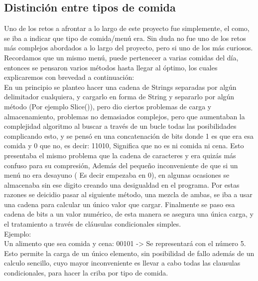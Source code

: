 \subsection{Distinción entre tipos de comida}
Uno de los retos a afrontar a lo largo de este proyecto fue simplemente, el como, se iba a indicar que tipo de comida/menú era. Sin duda no fue uno de los retos más complejos abordados a lo largo del proyecto, pero si uno de los más curiosos.
Recordamos que un mismo menú, puede pertenecer a varias comidas del día, entonces se pensaron varios métodos hasta llegar al óptimo, los cuales explicaremos con brevedad a continuación:\\

En un principio se planteo hacer una cadena de Strings separadas por algún delimitador cualquiera, y cargarlo en forma de String y separarlo por algún método (Por ejemplo Slice()), pero dio ciertos problemas de carga y almacenamiento, problemas no demasiados complejos, pero que aumentaban la complejidad algoritmo al buscar a través de un bucle todas las posibilidades complicando esto, y se pensó en una concatenación de bits donde 1 es que era esa comida y 0 que no, es decir: 11010, Significa que no es ni comida ni cena. Esto presentaba el mismo problema que la cadena de caracteres y era quizás más confuso para su compresión, Además del pequeño inconveniente de que si un menú no era desayuno ( Es decir empezaba en 0), en algunas ocasiones se almacenaba sin ese digito creando una desigualdad en el programa. Por estas razones se deicidio pasar al siguiente método, una mezcla de ambas, se iba a usar una cadena para calcular un único valor que cargar. Finalmente se paso esa cadena de bits a un valor numérico, de esta manera se asegura una única carga, y el tratamiento a través de cláusulas condicionales simples.\\
Ejemplo:\\
Un alimento que sea comida y cena: 00101 -> Se representará con el número 5. \\
Esto permite la carga de un único elemento, sin posibilidad de fallo además de un calculo sencillo, cuyo mayor inconveniente es llevar a cabo todas las clausulas condicionales, para hacer la criba por tipo de comida.\\
